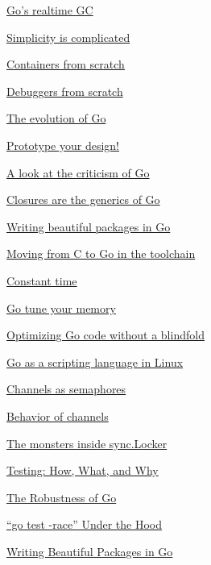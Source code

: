 \documentclass[12pt,notitlepage]{article}
\begin{document}
\href{https://www.youtube.com/watch?v=bMujSVMarqY}{Go's realtime GC}

\href{https://www.youtube.com/watch?v=rFejpH_tAHM&t=453s}{Simplicity is complicated}

\href{https://www.youtube.com/watch?v=_TsSmSu57Zo}{\color{red} Containers from scratch}

\href{https://youtu.be/ZrpkrMKYvqQ}{\color{red} Debuggers from scratch}

\href{https://www.youtube.com/watch?v=0ReKdcpNyQg}{The evolution of Go}

\href{https://www.youtube.com/watch?v=vLxX3yZmw5Q}{Prototype your design!}

\href{https://www.youtube.com/watch?v=gHCtEjzZ-rY}{A look at the criticism of Go}

\href{https://www.youtube.com/watch?v=5IKcPMJXkKs}{Closures are the generics of Go}

\href{https://medium.com/@matryer/video-writing-beautiful-packages-in-go-fab1138608ee}{Writing beautiful packages in Go}

\href{https://www.youtube.com/watch?v=cF1zJYkBW4A}{Moving from C to Go in the toolchain}

\href{https://www.youtube.com/watch?v=pN_lm6QqHcw}{Constant time}

\href{https://www.youtube.com/watch?v=uyifh6F_7WM}{Go tune your memory}

\href{https://www.youtube.com/watch?v=jiXnzkAzy30}{Optimizing Go code without a blindfold}

\href{https://www.youtube.com/watch?v=fcyHqDwGchI}{Go as a scripting language in Linux}

\href{https://www.dotconferences.com/2019/03/valentin-deleplace-semaphores}{\color{red} Channels as semaphores}

\href{https://www.youtube.com/watch?v=zDCKZn4-dck}{Behavior of channels}

\href{https://www.dotconferences.com/2019/03/roberto-clapis-the-monsters-inside-the-sync-locker}%
{The monsters inside sync.Locker}

\href{https://dave.cheney.net/paste/gopherchina-2019-testing-talk.pdf}{Testing: How, What, and Why}

\href{https://www.youtube.com/watch?v=ScE9TnoWltA}{The Robustness of Go}

\href{https://www.youtube.com/watch?v=5erqWdlhQLA}{``go test -race'' Under the Hood}

\href{https://www.youtube.com/watch?v=cmkKxNN7cs4}{Writing Beautiful Packages in Go}
\end{document}
